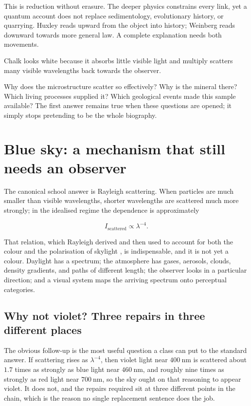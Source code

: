 This is reduction without erasure. The deeper physics constrains every link, yet a quantum account does not replace sedimentology, evolutionary history, or quarrying. Huxley reads upward from the object into history; Weinberg reads downward towards more general law. A complete explanation needs both movements.

\begin{compressed}
Chalk looks white because it absorbs little visible light and multiply scatters many visible wavelengths back towards the observer.
\end{compressed}

\begin{decompress}
Why does the microstructure scatter so effectively? Why is the mineral there? Which living processes supplied it? Which geological events made this sample available? The first answer remains true when these questions are opened; it simply stops pretending to be the whole biography.
\end{decompress}

\section{Blue sky: a mechanism that still needs an observer}

The canonical school answer is Rayleigh scattering. When particles are much smaller than visible wavelengths, shorter wavelengths are scattered much more strongly; in the idealised regime the dependence is approximately

\begin{equation*}
I_{\mathrm{scattered}} \propto \lambda^{-4}.
\end{equation*}

That relation, which Rayleigh derived and then used to account for both the colour and the polarisation of skylight \citep{strutt1871}, is indispensable, and it is not yet a colour. Daylight has a spectrum; the atmosphere has gases, aerosols, clouds, density gradients, and paths of different length; the observer looks in a particular direction; and a visual system maps the arriving spectrum onto perceptual categories.

\subsection{Why not violet? Three repairs in three different places}

The obvious follow-up is the most useful question a class can put to the standard answer. If scattering rises as $\lambda^{-4}$, then violet light near $400\ \mathrm{nm}$ is scattered about $1.7$ times as strongly as blue light near $460\ \mathrm{nm}$, and roughly nine times as strongly as red light near $700\ \mathrm{nm}$, so the sky ought on that reasoning to appear violet. It does not, and the repairs required sit at three different points in the chain, which is the reason no single replacement sentence does the job.

